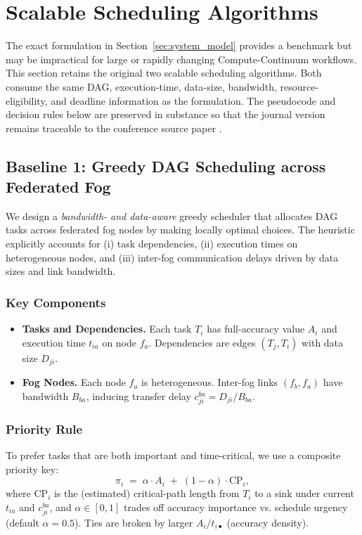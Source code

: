 \section{Scalable Scheduling Algorithms}
\label{sec:algorithms}

The exact formulation in Section~\ref{sec:system_model} provides a benchmark but may be impractical for large or rapidly changing Compute-Continuum workflows. This section retains the original two scalable scheduling algorithms. Both consume the same DAG, execution-time, data-size, bandwidth, resource-eligibility, and deadline information as the formulation. The pseudocode and decision rules below are preserved in substance so that the journal version remains traceable to the conference source paper \cite{gupta2025efficient}.

\subsection{Baseline 1: Greedy DAG Scheduling across Federated Fog}
\label{sec:baseline-greedy}

We design a \emph{bandwidth- and data-aware} greedy scheduler that allocates DAG tasks across federated fog nodes by making locally optimal choices. The heuristic explicitly accounts for (i) task dependencies, (ii) execution times on heterogeneous nodes, and (iii) inter-fog communication delays driven by data sizes and link bandwidth.

\subsubsection{Key Components}

\begin{itemize}[leftmargin=*]
    \item \textbf{Tasks and Dependencies.} Each task \(T_i\) has full-accuracy value \(A_i\) and execution time \(t_{ia}\) on node \(f_a\). Dependencies are edges \((T_j,T_i)\) with data size \(D_{ji}\).
    \item \textbf{Fog Nodes.} Each node \(f_a\) is heterogeneous. Inter-fog links \((f_b,f_a)\) have bandwidth \(B_{ba}\), inducing transfer delay \(c_{ji}^{ba}=D_{ji}/B_{ba}\).
\end{itemize}

\subsubsection{Priority Rule}
To prefer tasks that are both important and time-critical, we use a composite priority key:
\[
\pi_i \;=\; \alpha \cdot A_i \;+\; (1-\alpha)\cdot \text{CP}_i,
\]
where \(\text{CP}_i\) is the (estimated) critical-path length from \(T_i\) to a sink under current \(t_{ia}\) and \(c_{ji}^{ba}\), and \(\alpha\in[0,1]\) trades off accuracy importance vs. schedule urgency (default \(\alpha=0.5\)). Ties are broken by larger \(A_i/t_{i\bullet}\) (accuracy density).

